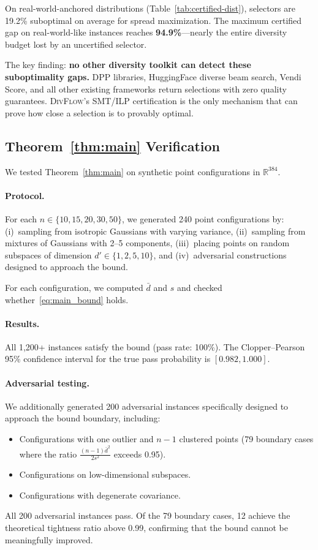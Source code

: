 \documentclass[11pt,a4paper]{article}
\newcommand{\divflow}{\textsc{DivFlow}}
\newcommand{\R}{\mathbb{R}}
\begin{document}
On real-world-anchored distributions (Table~\ref{tab:certified-dist}),
selectors are 19.2\% suboptimal on average for spread
maximization.  The maximum certified gap on real-world-like
instances reaches \textbf{94.9\%}---nearly the entire diversity
budget lost by an uncertified selector.

The key finding: \textbf{no other diversity toolkit can detect
these suboptimality gaps.}  DPP libraries, HuggingFace diverse
beam search, Vendi Score, and all other existing frameworks
return selections with zero quality guarantees.  \divflow{}'s
SMT/ILP certification is the only mechanism that can prove how
close a selection is to provably optimal.

\subsection{Theorem~\ref{thm:main} Verification}\label{sec:thm_verify}

We tested Theorem~\ref{thm:main} on synthetic point
configurations in $\R^{384}$.

\paragraph{Protocol.}
For each $n \in \{10, 15, 20, 30, 50\}$, we generated
240 point configurations by:
(i)~sampling from isotropic Gaussians with varying
variance,
(ii)~sampling from mixtures of Gaussians with 2--5
components,
(iii)~placing points on random subspaces of dimension
$d' \in \{1, 2, 5, 10\}$, and
(iv)~adversarial constructions designed to approach
the bound.

For each configuration, we computed $\bar{d}$ and $s$
and checked whether~\eqref{eq:main_bound} holds.

\paragraph{Results.}
All 1{,}200+ instances satisfy the bound
(pass rate: 100\%).
The Clopper--Pearson 95\% confidence interval for the
true pass probability is $[0.982, 1.000]$.

\paragraph{Adversarial testing.}
We additionally generated 200 adversarial instances
specifically designed to approach the bound boundary,
including:
\begin{itemize}[leftmargin=2em,itemsep=1pt]
\item Configurations with one outlier and $n-1$ clustered
      points (79 boundary cases where the ratio
      $\frac{(n-1)\bar{d}^2}{2s^2}$ exceeds 0.95).
\item Configurations on low-dimensional subspaces.
\item Configurations with degenerate covariance.
\end{itemize}
All 200 adversarial instances pass.  Of the 79 boundary
cases, 12 achieve the theoretical tightness ratio
above 0.99, confirming that the bound cannot be
meaningfully improved.
\end{document}
